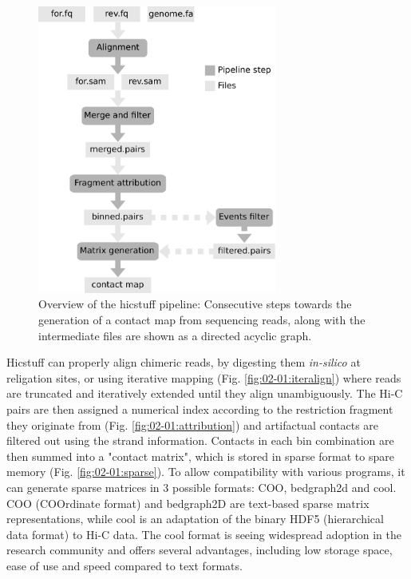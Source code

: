 \begin{figure}[htb]
    \includegraphics[width=0.7\textwidth]{Parts/Part02/gfx/hicstuff/pipeline.pdf}
    \caption[Overview of the hicstuff pipeline.]{Overview of the hicstuff pipeline: Consecutive steps towards the generation of a contact map from sequencing reads, along with the intermediate files are shown as a directed acyclic graph.}
    \label{fig:02-01:pipeline}
\end{figure}

Hicstuff can properly align chimeric reads, by digesting them \textit{in-silico} at religation sites, or using iterative mapping (Fig. \ref{fig:02-01:iteralign}) where reads are truncated and iteratively extended until they align unambiguously. The Hi-C pairs are then assigned a numerical index according to the restriction fragment they originate from (Fig. \ref{fig:02-01:attribution}) and artifactual contacts are filtered out using the strand information. Contacts in each bin combination are then summed into a "contact matrix", which is stored in sparse format to spare memory (Fig. \ref{fig:02-01:sparse}). To allow compatibility with various programs, it can generate sparse matrices in 3 possible formats: COO, bedgraph2d and cool. COO (COOrdinate format) and bedgraph2D are text-based sparse matrix representations, while cool \cite{abdennurCoolerScalableStorage2020} is an adaptation of the binary HDF5 (hierarchical data format) to Hi-C data. The cool format is seeing widespread adoption in the research community and offers several advantages, including low storage space, ease of use and speed compared to text formats.

